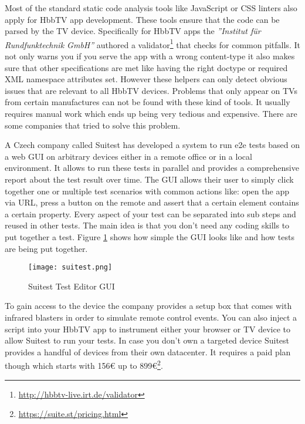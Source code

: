 Most of the standard static code analysis tools like JavaScript or CSS linters also apply for HbbTV app development. These tools ensure that the code can be parsed by the TV device. Specifically for HbbTV apps the \textit{''Institut für Rundfunktechnik GmbH''} authored a validator\footnote{\url{http://hbbtv-live.irt.de/validator}} that checks for common pitfalls. It not only warns you if you serve the app with a wrong content-type it also makes sure that other specifications are met like having the right doctype or required XML namespace attributes set. However these helpers can only detect obvious issues that are relevant to all HbbTV devices. Problems that only appear on TVs from certain manufactures can not be found with these kind of tools. It usually requires manual work which ends up being very tedious and expensive. There are some companies that tried to solve this problem.

A Czech company called Suitest has developed a system to run e2e tests based on a web GUI on arbitrary devices either in a remote office or in a local environment. It allows to run these tests in parallel and provides a comprehensive report about the test result over time. The GUI allows their user to simply click together one or multiple test scenarios with common actions like: open the app via URL, press a button on the remote and assert that a certain element contains a certain property. Every aspect of your test can be separated into sub steps and reused in other tests. The main idea is that you don't need any coding skills to put together a test. Figure \ref{fig:suitest} shows how simple the GUI looks like and how tests are being put together.

\begin{figure}[htb]
  \centering
  \texttt{[image: suitest.png]}\\
  \caption{Suitest Test Editor GUI}\label{fig:suitest}
\end{figure}

To gain access to the device the company provides a setup box that comes with infrared blasters in order to simulate remote control events. You can also inject a script into your HbbTV app to instrument either your browser or TV device to allow Suitest to run your tests. In case you don't own a targeted device Suitest provides a handful of devices from their own datacenter. It requires a paid plan though which starts with 156\euro{} up to 899\euro{}\footnote{\url{https://suite.st/pricing.html}}.

